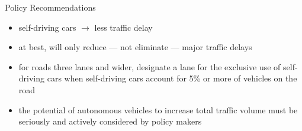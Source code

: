 \begin{frame}{Policy Recommendations}
\begin{itemize}
    \item self-driving cars $\rightarrow$ less traffic delay
    \item at best, will only reduce --- not eliminate --- major traffic delays
    \item for roads three lanes and wider, designate a lane for the exclusive use of self-driving cars when self-driving cars account for 5\% or more of vehicles on the road
	\item the potential of autonomous vehicles to increase total traffic volume \cite{Org2014Www.vtpi.orgPlanning} must be seriously and actively considered by policy makers
\end{itemize}
\end{frame}